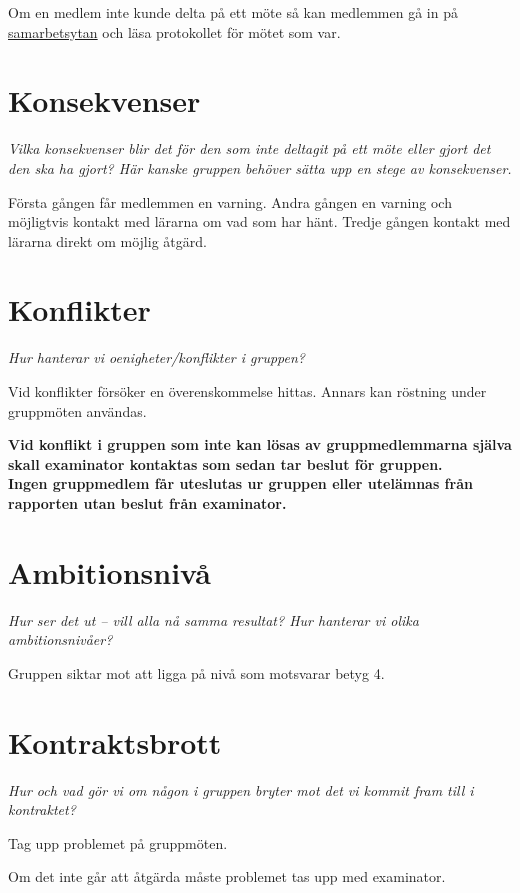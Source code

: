 Om en medlem inte kunde delta på ett möte så kan medlemmen gå in på \href{https://github.com/anhility/DVA227}{samarbetsytan} och läsa protokollet för mötet som var.

\section*{Konsekvenser}
\textit{Vilka konsekvenser blir det för den som inte deltagit på ett möte eller gjort det den ska ha gjort? Här kanske gruppen behöver sätta upp en stege av konsekvenser.}

Första gången får medlemmen en varning. Andra gången en varning och möjligtvis kontakt med lärarna om vad som har hänt. Tredje gången kontakt med lärarna direkt om möjlig åtgärd.

\section*{Konflikter}
\textit{Hur hanterar vi oenigheter/konflikter i gruppen?}

Vid konflikter försöker en överenskommelse hittas. Annars kan röstning under gruppmöten användas.

\textbf{Vid konflikt i gruppen som inte kan lösas av gruppmedlemmarna själva skall examinator kontaktas som sedan tar beslut för gruppen. \\
Ingen gruppmedlem får uteslutas ur gruppen eller utelämnas från rapporten utan beslut från examinator.}

\section*{Ambitionsnivå}
\textit{Hur ser det ut – vill alla nå samma resultat? Hur hanterar vi olika ambitionsnivåer?}

Gruppen siktar mot att ligga på nivå som motsvarar betyg 4.

\section*{Kontraktsbrott}
\textit{Hur och vad gör vi om någon i gruppen bryter mot det vi kommit fram till i kontraktet?}

Tag upp problemet på gruppmöten.

Om det inte går att åtgärda måste problemet tas upp med examinator.

\newpage

\vspace*{\fill}

